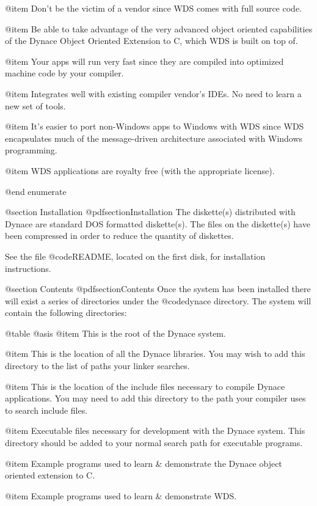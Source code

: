 @item
Don't be the victim of a vendor since WDS comes with full source code.

@item
Be able to take advantage of the very advanced object oriented
capabilities of the Dynace Object Oriented Extension to C, which
WDS is built on top of.

@item
Your apps will run very fast since they are compiled into optimized
machine code by your compiler.

@item
Integrates well with existing compiler vendor's IDEs.  No need to
learn a new set of tools.

@item
It's easier to port non-Windows apps to Windows with WDS since WDS
encapsulates much of the message-driven architecture associated with
Windows programming.

@item
WDS applications are royalty free (with the appropriate license).

@end enumerate


@section Installation
@pdfsection{Installation}
The diskette(s) distributed with Dynace are standard DOS formatted
diskette(s).  The files on the diskette(s) have been compressed in order
to reduce the quantity of diskettes. 

See the file @code{README}, located on the first disk, for
installation instructions.



@section Contents
@pdfsection{Contents}
Once the system has been installed there will exist a series of
directories under the @code{dynace} directory.  The system will contain
the following directories:


@table @asis
@item \DYNACE
This is the root of the Dynace system.

@item \DYNACE\LIB
This is the location of all the Dynace libraries.  You may wish to add
this directory to the list of paths your linker searches.

@item \DYNACE\INCLUDE
This is the location of the include files necessary to compile Dynace
applications.  You may need to add this directory to the path your
compiler uses to search include files.

@item \DYNACE\BIN
Executable files necessary for development with the Dynace system.
This directory should be added to your normal search path for executable
programs.

@item \DYNACE\EXAMPLES
Example programs used to learn & demonstrate the Dynace object oriented
extension to C.

@item \DYNACE\WINEXAM
Example programs used to learn & demonstrate WDS.

